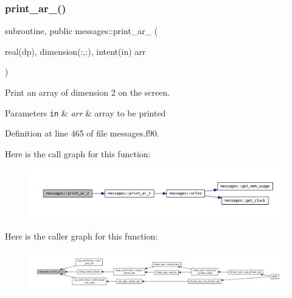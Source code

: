 \subsubsection{\texorpdfstring{print\+\_\+ar\+\_()}{print\_ar\_2()}}
{\footnotesize\ttfamily subroutine, public messages\+::print\+\_\+ar\+\_ (\begin{DoxyParamCaption}\item[{real(dp), dimension(\+:,\+:), intent(in)}]{arr }\end{DoxyParamCaption})}



Print an array of dimension 2 on the screen. 


\begin{DoxyParams}[1]{Parameters}
\mbox{\tt in}  & {\em arr} & array to be printed \\
\hline
\end{DoxyParams}


Definition at line 465 of file messages.\+f90.

Here is the call graph for this function\+:\nopagebreak
\begin{figure}[H]
\begin{center}
\leavevmode
\includegraphics[width=350pt]{namespacemessages_a80797cedef6112b8dccaeda431f0c610_cgraph}
\end{center}
\end{figure}
Here is the caller graph for this function\+:\nopagebreak
\begin{figure}[H]
\begin{center}
\leavevmode
\includegraphics[width=350pt]{namespacemessages_a80797cedef6112b8dccaeda431f0c610_icgraph}
\end{center}
\end{figure}
\mbox{\label{namespacemessages_a0da9248828de8b7480b99b47618e8310}} 
